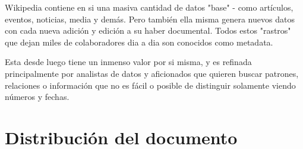 Wikipedia contiene en si una masiva cantidad de datos "base" - como artículos, eventos, noticias, media y demás. Pero también ella misma genera nuevos datos con cada nueva adición y edición a su haber documental. Todos estos "rastros" que dejan miles de colaboradores dia a dia son conocidos como metadata.

Esta desde luego tiene un inmenso valor por si misma, y es refinada principalmente por analistas de datos y aficionados que quieren buscar patrones, relaciones o información que no es fácil o posible de distinguir solamente viendo números y fechas.










\section{Distribución del documento}

